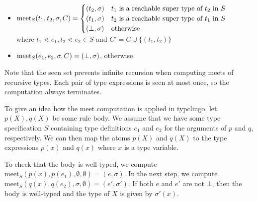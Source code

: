 \documentclass{amsart}
\begin{document}
\begin{itemize}
        where $C' = C \cup \{(f(e_1,\dots,e_n), f(g_1,\dots,g_n))\}$, $\sigma_0 = \sigma$ and $(h_i, \sigma_i) = \meet_S(e_i,g_i,\sigma_{i-1}, C')$
    \item $\mathrm{meet}_S(t_1,t_2,\sigma,C) = \begin{cases} (t_2, \sigma) & t_1 \text{ is a reachable super type of } t_2 \text{ in } S \\ (t_1, \sigma) & t_2 \text{ is a reachable super type of } t_1 \text{ in } S \\ (\bot,\sigma) & \text{otherwise} \end{cases}$\\
        where $t_1 \lessdot e_1, t_2 \lessdot e_2 \in S$ and $C' = C \cup \{(t_1, t_2)\}$
    \item $\mathrm{meet}_S(e_1,e_2,\sigma,C) = (\bot,\sigma)$, otherwise
\end{itemize}

Note that the seen set prevents infinite recursion when computing meets of recursive types.
Each pair of type expressions is seen at most once, so the computation always terminates.

To give an idea how the meet computation is applied in typclingo,
let $p(X), q(X)$ be some rule body.
We assume that we have some type specification $S$ containing type definitions $e_1$ and $e_2$
for the arguments of $p$ and $q$, respectively.
We can then map the atoms $p(X)$ and $q(X)$ to the type expressions $p(x)$ and $q(x)$ where $x$ is a type variable.

To check that the body is well-typed,
we compute $\mathrm{meet}_{S}(p(x), p(e_1),\emptyset,\emptyset) = (e,\sigma)$.
In the next step, we compute $\mathrm{meet}_{S}(q(x), q(e_2),\sigma,\emptyset) = (e',\sigma')$.
If both $e$ and $e'$ are not $\bot$,
then the body is well-typed and the type of $X$ is given by $\sigma'(x)$.
\end{document}
